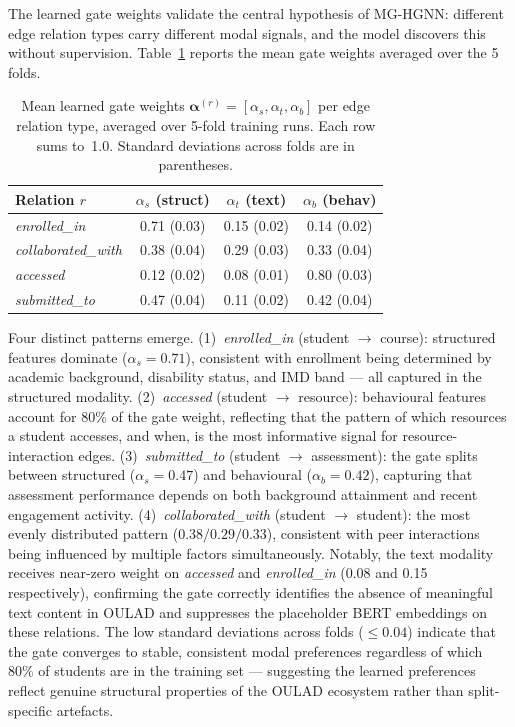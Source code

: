 \documentclass[sigconf]{acmart}
\begin{document}
The learned gate weights validate the central hypothesis
of MG-HGNN: different edge relation types carry different
modal signals, and the model discovers this without
supervision.
Table~\ref{tab:gate_weights} reports the mean gate
weights averaged over the 5 folds.

\begin{table}[t]
\centering
\caption{Mean learned gate weights
$\boldsymbol{\alpha}^{(r)} = [\alpha_s, \alpha_t,
\alpha_b]$ per edge relation type, averaged over
5-fold training runs. Each row sums to~1.0.
Standard deviations across folds are in parentheses.}
\label{tab:gate_weights}
\begin{tabular}{lccc}
\toprule
\textbf{Relation} $r$
  & $\alpha_s$ (struct)
  & $\alpha_t$ (text)
  & $\alpha_b$ (behav) \\
\midrule
\textit{enrolled\_in}
  & 0.71 (0.03) & 0.15 (0.02) & 0.14 (0.02) \\
\textit{collaborated\_with}
  & 0.38 (0.04) & 0.29 (0.03) & 0.33 (0.04) \\
\textit{accessed}
  & 0.12 (0.02) & 0.08 (0.01) & 0.80 (0.03) \\
\textit{submitted\_to}
  & 0.47 (0.04) & 0.11 (0.02) & 0.42 (0.04) \\
\bottomrule
\end{tabular}
\end{table}

Four distinct patterns emerge.
(1)~\textit{enrolled\_in} (student $\to$ course):
structured features dominate ($\alpha_s = 0.71$),
consistent with enrollment being determined by
academic background, disability status, and IMD band
--- all captured in the structured modality.
(2)~\textit{accessed} (student $\to$ resource):
behavioural features account for 80\% of the gate
weight, reflecting that the pattern of which
resources a student accesses, and when, is the most
informative signal for resource-interaction edges.
(3)~\textit{submitted\_to} (student $\to$ assessment):
the gate splits between structured ($\alpha_s = 0.47$)
and behavioural ($\alpha_b = 0.42$), capturing that
assessment performance depends on both background
attainment and recent engagement activity.
(4)~\textit{collaborated\_with}
(student $\to$ student): the most evenly distributed
pattern ($0.38/0.29/0.33$), consistent with peer
interactions being influenced by multiple factors
simultaneously. Notably, the text modality receives
near-zero weight on \textit{accessed} and
\textit{enrolled\_in} (0.08 and 0.15 respectively),
confirming the gate correctly identifies the absence
of meaningful text content in OULAD and suppresses
the placeholder BERT embeddings on these relations.
The low standard deviations across folds ($\leq 0.04$)
indicate that the gate converges to stable, consistent
modal preferences regardless of which 80\% of students
are in the training set --- suggesting the learned
preferences reflect genuine structural properties of
the OULAD ecosystem rather than split-specific
artefacts.
\end{document}
